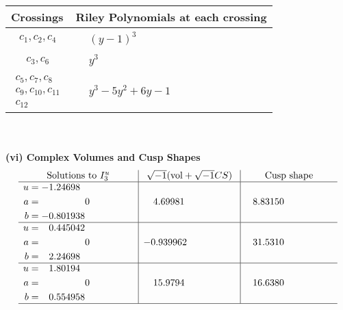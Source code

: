 \documentclass[1p]{elsarticle_modified}
\theoremstyle{definition}
\newcommand{\I}{\sqrt{-1}}
\begin{document}
\begin{tabular}{m{50pt}|m{274pt}}
Crossings & \hspace{64pt}Riley Polynomials at each crossing \\
\hline $$\begin{aligned}c_{1},c_{2},c_{4}\end{aligned}$$&$\begin{aligned}
&(y-1)^3
\end{aligned}$\\
\hline $$\begin{aligned}c_{3},c_{6}\end{aligned}$$&$\begin{aligned}
&y^3
\end{aligned}$\\
\hline $$\begin{aligned}c_{5},c_{7},c_{8}\\c_{9},c_{10},c_{11}\\c_{12}\end{aligned}$$&$\begin{aligned}
&y^3-5 y^2+6 y-1
\end{aligned}$\\
\hline
\end{tabular}\\~\\
\newpage\flushleft \textbf{(vi) Complex Volumes and Cusp Shapes}
$$\begin{array}{c|c|c}  
\text{Solutions to }I^u_{3}& \I (\text{vol} + \sqrt{-1}CS) & \text{Cusp shape}\\
 \hline 
\begin{aligned}
u &= -1.24698\phantom{ +0.000000I} \\
a &= \phantom{-0.000000 } 0 \\
b &= -0.801938\phantom{ +0.000000I}\end{aligned}
 & \phantom{-}4.69981\phantom{ +0.000000I} & \phantom{-}8.83150\phantom{ +0.000000I} \\ \hline\begin{aligned}
u &= \phantom{-}0.445042\phantom{ +0.000000I} \\
a &= \phantom{-0.000000 } 0 \\
b &= \phantom{-}2.24698\phantom{ +0.000000I}\end{aligned}
 & -0.939962\phantom{ +0.000000I} & \phantom{-}31.5310\phantom{ +0.000000I} \\ \hline\begin{aligned}
u &= \phantom{-}1.80194\phantom{ +0.000000I} \\
a &= \phantom{-0.000000 } 0 \\
b &= \phantom{-}0.554958\phantom{ +0.000000I}\end{aligned}
 & \phantom{-}15.9794\phantom{ +0.000000I} & \phantom{-}16.6380\phantom{ +0.000000I}\\
 \hline 
 \end{array}$$\newpage
\end{document}
